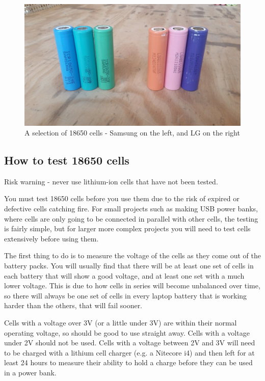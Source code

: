 \documentclass{article}
\theoremstyle{definition}
\theoremstyle{definition}
\theoremstyle{remark}
\begin{document}
    \begin{figure}[!ht]
      \centering
      \includegraphics[width=0.4\paperwidth]{../Images/image_5_4_(samsung_lg_cells).png}
      \caption*{\centering A selection of 18650 cells - Samsung on the left, and LG on the right}
    \end{figure}


  \subsection{How to test 18650 cells} %
  \label{sub:how_to_test_18650_cells}

    Risk warning - never use lithium-ion cells that have not been tested.

    You must test 18650 cells before you use them due to the risk of expired or defective cells catching fire. For small projects such as making USB power banks, where cells are only going to be connected in parallel with other cells, the testing is fairly simple, but for larger more complex projects you will need to test cells extensively before using them.

    The first thing to do is to measure the voltage of the cells as they come out of the battery packs. You will usually find that there will be at least one set of cells in each battery that will show a good voltage, and at least one set with a much lower voltage. This is due to how cells in series will become unbalanced over time, so there will always be one set of cells in every laptop battery that is working harder than the others, that will fail sooner.

    Cells with a voltage over 3V (or a little under 3V) are within their normal operating voltage, so should be good to use straight away. Cells with a voltage under 2V should not be used. Cells with a voltage between 2V and 3V will need to be charged with a lithium cell charger (e.g. a Nitecore i4) and then left for at least 24 hours to measure their ability to hold a charge before they can be used in a power bank.
\end{document}
